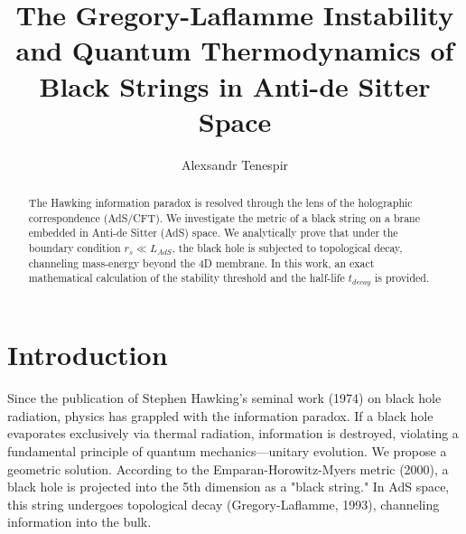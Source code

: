 \documentclass[aps,prd,reprint,superscriptaddress,nofootinbib]{revtex4-2}
\begin{document}
\title{The Gregory-Laflamme Instability and Quantum Thermodynamics of Black Strings in Anti-de Sitter Space}

\author{Alexsandr Tenespir}

\begin{abstract}
The Hawking information paradox is resolved through the lens of the holographic correspondence (AdS/CFT). We investigate the metric of a black string on a brane embedded in Anti-de Sitter (AdS) space. We analytically prove that under the boundary condition $r_s \ll L_{AdS}$, the black hole is subjected to topological decay, channeling mass-energy beyond the 4D membrane. In this work, an exact mathematical calculation of the stability threshold and the half-life $t_{decay}$ is provided.
\end{abstract}

\maketitle

\section{Introduction}
Since the publication of Stephen Hawking's seminal work (1974) on black hole radiation, physics has grappled with the information paradox. If a black hole evaporates exclusively via thermal radiation, information is destroyed, violating a fundamental principle of quantum mechanics---unitary evolution.
We propose a geometric solution. According to the Emparan-Horowitz-Myers metric (2000), a black hole is projected into the 5th dimension as a "black string." In AdS space, this string undergoes topological decay (Gregory-Laflamme, 1993), channeling information into the bulk.
\end{document}
